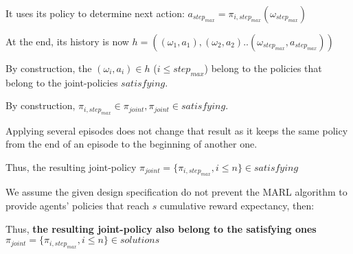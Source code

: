 \documentclass{ecai}
\begin{document}
    It uses its policy to determine next action: $a_{step_{max}} = \pi_{i,step_{max}}(\omega_{step_{max}})$

    At the end, its history is now $h = ((\omega_1, a_1), (\omega_2, a_2)..(\omega_{step_{max}}, a_{step_{max}}))$

    By construction, the $(\omega_i,a_i) \in h$ ($i \leq step_{max}$) belong to the policies that belong to the joint-policies $satisfying$.
    
    By construction, $\pi_{i,step_{max}} \in \pi_{joint}, \pi_{joint} \in satisfying$.

    Applying several episodes does not change that result as it keeps the same policy from the end of an episode to the beginning of another one.

    Thus, the resulting joint-policy $\pi_{joint} = \{\pi_{i,step_{max}}, i \leq n\} \in satisfying$

    We assume the given design specification do not prevent the MARL algorithm to provide agents' policies that reach $s$ cumulative reward expectancy, then:

    Thus, \textbf{the resulting joint-policy also belong to the satisfying ones} $\pi_{joint} = \{\pi_{i,step_{max}}, i \leq n\} \in solutions$ 
\end{document}
